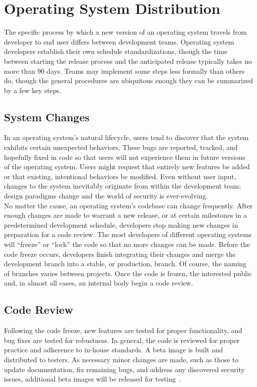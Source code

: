 \documentclass[conference]{IEEEtran}
\begin{document}
\section{Operating System Distribution}

The specific process by which a new version of an operating system
travels from developer to end user differs between development teams.
Operating system developers establish their own schedule
standardizations, though the time between starting the release process
and the anticipated release typically takes no more than 90 days.
Teams may implement some steps less formally than others do,
though the general procedures are ubiquitous enough they can be
summarized by a few key steps.

\subsection{System Changes}

In an operating system's natural lifecycle, users tend to discover that
the system exhibits certain unexpected behaviors.
These bugs are reported, tracked, and hopefully fixed in code so that
users will not experience them in future versions of the operating system.
Users might request that entirely new features be added
or that existing, intentional behaviors be modified.
Even without user input, changes to the system inevitably
originate from within the development team; design paradigms change
and the world of security is ever-evolving.\\
\indent No matter the cause, an operating system's codebase can change
frequently. After enough changes are made to warrant a new release,
or at certain milestones in a predetermined development schedule,
developers stop making new changes in preparation for a code review.
The most developers of different operating systems will ``freeze''
or ``lock'' the code so that no more changes can be made.
Before the code freeze occurs, developers finish integrating their changes
and merge the development branch into a stable, or production, branch.
Of course, the naming of branches varies between projects.
Once the code is frozen, the interested public and, in almost all cases,
an internal body begin a code review.

\subsection{Code Review}
Following the code freeze, new features are tested for proper functionality,
and bug fixes are tested for robustness. In general, the code
is reviewed for proper practice and adherence to in-house standards.
A beta image is built and distributed to testers.
As necessary minor changes are made, such as those to update documentation,
fix remaining bugs, and address any discovered security issues,
additional beta images will be released for testing~\cite{freebsdrelease}.
\end{document}
